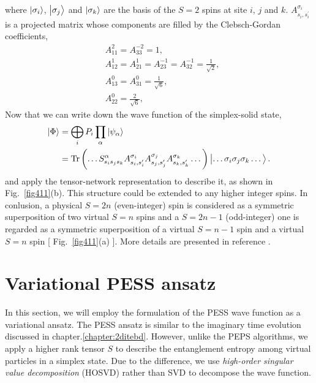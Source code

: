 where $\Ket{\sigma_i}$, $\Ket{\sigma_j}$ and $\Ket{\sigma_k}$ are the basis of the $S=2$ spins at site $i$, $j$ and $k$. $A^{\sigma_i}_{s_i,s_i^{\prime}}$ is a projected matrix whose components are filled by the Clebsch-Gordan coefficients,
\[
	\begin{aligned}
		&A_{11}^2 = A_{33}^{-2} = 1, \\
		&A_{12}^1 = A_{21}^{1} = A_{23}^{-1} = A_{32}^{-1} = \frac{1}{\sqrt{2}}, \\
		&A_{13}^0 = A_{31}^{0} = \frac{1}{\sqrt{6}}, \\
		&A_{22}^0 = \frac{2}{\sqrt{6}},
	\end{aligned}
\]
Now that we can write down the wave function of the simplex-solid state,
\begin{align}
	\Ket{\Phi} &= \bigoplus_i P_i \prod_{\alpha}{\Ket{\psi_{\alpha}}} \\
	&= \operatorname{Tr} \left( \dots S_{s_i s_j s_k}^{\alpha} A^{\sigma_i}_{s_i,s_i^{\prime}} A^{\sigma_j}_{s_j,s_j^{\prime}} A^{\sigma_k}_{s_k,s_k^{\prime}} \dots \right) \Ket{\dots \sigma_i \sigma_j \sigma_k \dots}.
\end{align}
and apply the tensor-network representation to describe it, as shown in Fig.~\ref{fig411}(b).
This structure could be extended to any higher integer spins. In conlusion, a physical $S=2n$ (even-integer) spin is considered as a symmetric superposition of two virtual $S=n$ spins and a $S=2n-1$ (odd-integer) one is regarded as a symmetric superposition of a virtual $S=n-1$ spin and a virtual $S=n$ spin [ Fig.~\ref{fig411}(a) ]. More details are presented in reference \cite{PhysRevB.93.075154} \cite{0953-8984-21-45-456009}.

\section{Variational PESS ansatz}
\label{vpess}
In this section, we will employ the formulation of the PESS wave function as a variational ansatz. The PESS ansatz is similar to the imaginary time evolution discussed in chapter.\ref{chapter:2ditebd}. However, unlike the PEPS algorithms, we apply a higher rank tensor $S$ to describe the entanglement entropy among virtual particles in a simplex state. Due to the difference, we use \textit{high-order singular value decomposition} (HOSVD) \cite{PhysRevB.86.045139} \cite{doi:10.1137/S0895479896305696} rather than SVD to decompose the wave function.
